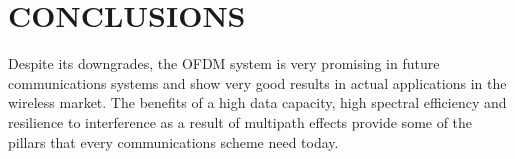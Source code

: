 \section{CONCLUSIONS}

Despite its downgrades, the OFDM system is very promising in future communications systems and show very good results in actual applications in the wireless market. The benefits of a high data capacity, high spectral efficiency and resilience to interference as a result of multipath effects provide some of the pillars that every communications scheme need today.